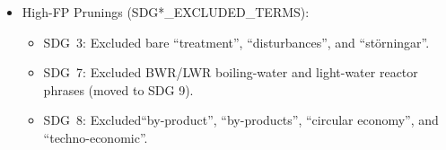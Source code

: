 \begin{itemize}
\begin{itemize}
\item S\gls{SDG}~12: Added \enquote{life cycle}, \enquote{life cycle assessment}, \enquote{life cycle cost},\enquote{life cycle management}, \enquote{reclaimed water}, \enquote{water reuse}, \enquote{livscykelanalys}, \enquote{livscykelanalyser}, \enquote{livscykelkostnad}, \enquote{återanvänt vatten}, and \enquote{LCA}.

\item \gls{SDG}~13: Added \enquote{climate}, \enquote{climates}, \enquote{klimat}.

\item \gls{SDG}~14: Added \enquote{sea}, \enquote{ocean}, \enquote{waters}, \enquote{coast}, \enquote{coastal}, \enquote{fish}, \enquote{arctic}, \enquote{atlantic}, \enquote{hav}, \enquote{havet}, \enquote{kust}, and \enquote{fisk}.   

\item \gls{SDG}~15: Added \enquote{soil}, \enquote{soils}, \enquote{forest}, \enquote{forests}, \enquote{species}, \enquote{conservation}, \enquote{ecological}, \enquote{compost}, \enquote{jord}, \enquote{mark}, \enquote{skog}, \enquote{skogar}, \enquote{arter}, and \enquote{naturvård}.   

\item \gls{SDG}~16: Added \enquote{law}, \enquote{legal}, \enquote{justice}, \enquote{rights}, \enquote{administrative}, \enquote{reforms}, \enquote{juridik}, \enquote{juridisk}, \enquote{rättigheter}, and \enquote{förvaltning}.

\item \gls{SDG}~17: Added \enquote{cooperation}, \enquote{partnership}, \enquote{partnerships}, \enquote{international}, \enquote{partnerskap}, and  \enquote{internationell}.
\end{itemize}

\item High-FP Prunings (SDG*\_EXCLUDED\_TERMS):
\begin{itemize}
\item \gls{SDG}~3: Excluded bare \enquote{treatment}, \enquote{disturbances}, and \enquote{störningar}.

\item \gls{SDG}~7: Excluded BWR/LWR boiling-water and light-water reactor phrases (moved to SDG 9).

\item \gls{SDG}~8: Excluded\enquote{by-product}, \enquote{by-products}, \enquote{circular economy}, and \enquote{techno-economic}.


\end{itemize}
\end{itemize}
